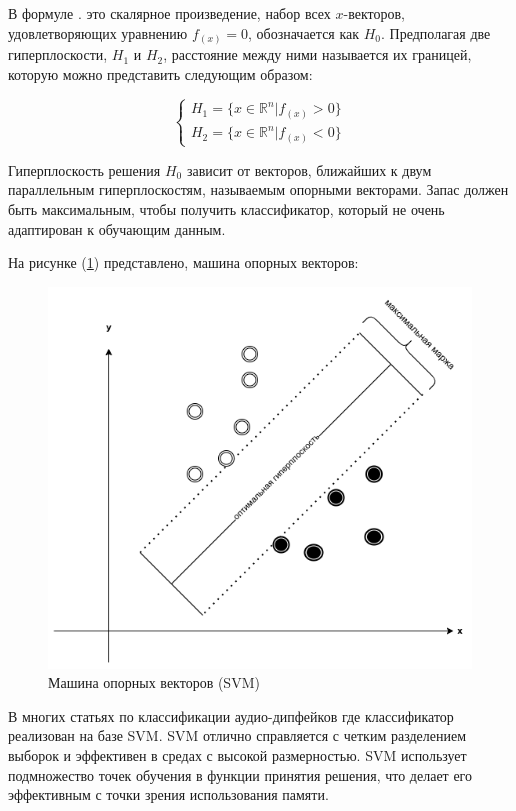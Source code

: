 В формуле \(.\) это скалярное произведение, набор всех \(x\)-векторов, удовлетворяющих уравнению \(f_{(x)} = 0\), обозначается как \(H_{0}\). Предполагая две гиперплоскости, \(H_{1}\) и \(H_{2}\), расстояние между ними называется их границей, которую можно представить следующим образом:

\[
    \begin{cases}
        H_{1} = \{x \in \mathbb{R}^{n} | f_{(x)} > 0\} \\
        H_{2} = \{x \in \mathbb{R}^{n} | f_{(x)} < 0\}
    \end{cases}
\]

Гиперплоскость решения \(H_{0}\) зависит от векторов, ближайших к двум параллельным гиперплоскостям, называемым опорными векторами. Запас должен быть максимальным, чтобы получить классификатор, который не очень адаптирован к обучающим данным.

На рисунке (\ref{fig:support-vector-machine}) представлено, машина опорных векторов: 
\begin{figure}[H]
	\centering
	\includegraphics[width=0.4\linewidth]{images/support-vector-machine.png}
	\caption{Машина опорных векторов (SVM)}
	\label{fig:support-vector-machine}
\end{figure}

В многих статьях по классификации аудио-дипфейков где классификатор реализован на базе SVM. SVM отлично справляется с четким разделением выборок и эффективен в средах с высокой размерностью. SVM использует подмножество точек обучения в функции принятия решения, что делает его эффективным с точки зрения использования памяти.

% 

